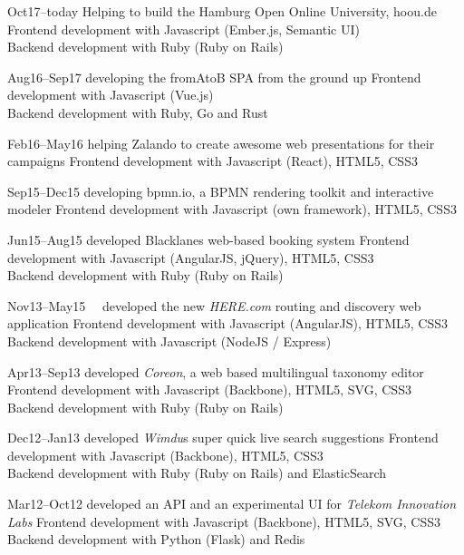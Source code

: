\documentclass[]{friggeri-cv}
\begin{document}
\begin{entrylist}
  \entry
    {Oct17–today}
    {Helping to build the Hamburg Open Online University, hoou.de}
    {}
    {Frontend development with Javascript (Ember.js, Semantic UI)\\
     Backend development with Ruby (Ruby on Rails)}

  \entry
    {Aug16–Sep17}
    {developing the fromAtoB SPA from the ground up}
    {}
    {Frontend development with Javascript (Vue.js)\\
     Backend development with Ruby, Go and Rust}

  \entry
    {Feb16–May16}
    {helping Zalando to create awesome web presentations for their campaigns}
    {}
    {Frontend development with Javascript (React), HTML5, CSS3}

  \entry
    {Sep15–Dec15}
    {developing bpmn.io, a BPMN rendering toolkit and interactive modeler}
    {}
    {Frontend development with Javascript (own framework), HTML5, CSS3}

  \entry
    {Jun15–Aug15}
    {developed Blacklanes web-based booking system}
    {}
    {Frontend development with Javascript (AngularJS, jQuery), HTML5, CSS3\\
     Backend development with Ruby (Ruby on Rails)}

  \entry
    {Nov13–May15~~}
    {developed the new \emph{HERE.com} routing and discovery web application}
    {}
    {Frontend development with Javascript (AngularJS), HTML5, CSS3\\
     Backend development with Javascript (NodeJS / Express)}

  \entry
    {Apr13–Sep13}
    {developed \emph{Coreon}, a web based multilingual taxonomy editor}
    {}
    {Frontend development with Javascript (Backbone), HTML5, SVG, CSS3\\
     Backend development with Ruby (Ruby on Rails)}

  \entry
    {Dec12–Jan13}
    {developed \emph{Wimdu}s super quick live search suggestions}
    {}
    {Frontend development with Javascript (Backbone), HTML5, CSS3\\
     Backend development with Ruby (Ruby on Rails) and ElasticSearch}

  \entry
    {Mar12–Oct12}
    {developed an API and an experimental UI for \emph{Telekom Innovation Labs}}
    {}
    {Frontend development with Javascript (Backbone), HTML5, SVG, CSS3\\
     Backend development with Python (Flask) and Redis}


\end{entrylist}
\end{document}
